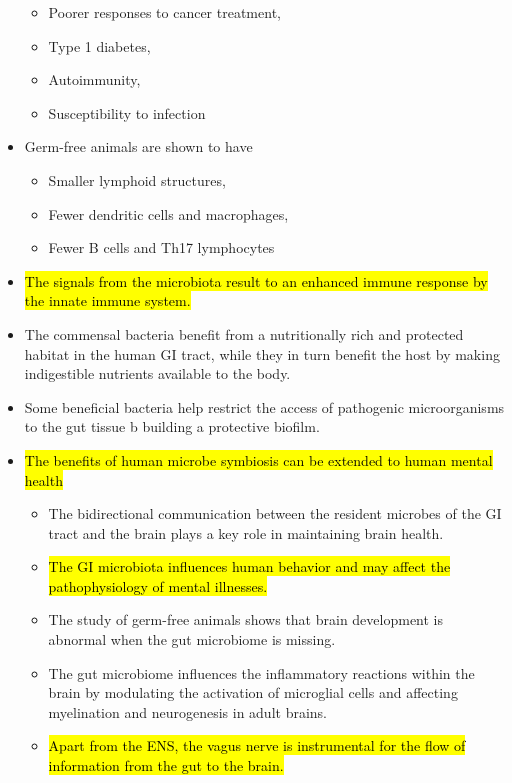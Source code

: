 \documentclass[a4paper, 12pt]{article}
\begin{document}
\begin{itemize}
\begin{itemize}
\item{Poorer responses to cancer treatment,}
\item{Type 1 diabetes,}
\item{Autoimmunity,}
\item{Susceptibility to infection}
\end{itemize}
\item{Germ-free animals are shown to have}
\begin{itemize}
\item{Smaller lymphoid structures,}
\item{Fewer dendritic cells and macrophages,}
\item{Fewer B cells and Th17 lymphocytes}
\end{itemize}
\item{\hl{The signals from the microbiota result to an enhanced immune response by the innate immune system.}}
\item{The commensal bacteria benefit from a nutritionally rich and protected habitat in the human GI tract, while they in turn benefit the host by making indigestible nutrients available to the body.}
\item{Some beneficial bacteria help restrict the access of pathogenic microorganisms to the gut tissue b building a protective biofilm.}
\item{\hl{The benefits of human microbe symbiosis can be extended to human mental health}}
\begin{itemize}
\item{The bidirectional communication between the resident microbes of the GI tract and the brain plays a key role in maintaining brain health.}
\item{\hl{The GI microbiota influences human behavior and may affect the pathophysiology of mental illnesses.}}
\item{The study of germ-free animals shows that brain development is abnormal  when the gut microbiome is missing. }
\item{The gut microbiome influences the inflammatory reactions within the brain by modulating the activation of microglial cells and affecting myelination and neurogenesis in adult brains.}
\item{\hl{Apart from the ENS, the vagus nerve is instrumental for the flow of information from the gut to the brain.}}
\end{itemize}
\end{itemize}
\end{document}
